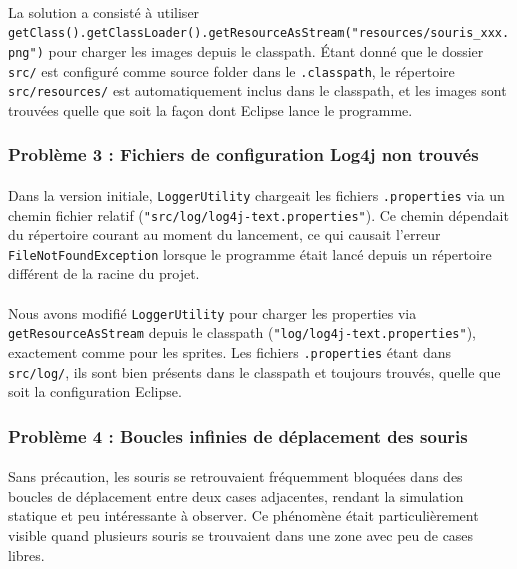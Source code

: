 \paragraph{} La solution a consisté à utiliser \texttt{getClass().getClassLoader().getResourceAsStream("resources/souris\_xxx.png")} pour charger les images depuis le classpath. Étant donné que le dossier \texttt{src/} est configuré comme source folder dans le \texttt{.classpath}, le répertoire \texttt{src/resources/} est automatiquement inclus dans le classpath, et les images sont trouvées quelle que soit la façon dont Eclipse lance le programme.

\subsubsection{Problème 3 : Fichiers de configuration Log4j non trouvés}

\paragraph{} Dans la version initiale, \texttt{LoggerUtility} chargeait les fichiers \texttt{.properties} via un chemin fichier relatif (\texttt{"src/log/log4j-text.properties"}). Ce chemin dépendait du répertoire courant au moment du lancement, ce qui causait l'erreur \texttt{FileNotFoundException} lorsque le programme était lancé depuis un répertoire différent de la racine du projet.

\paragraph{} Nous avons modifié \texttt{LoggerUtility} pour charger les properties via \texttt{getResourceAsStream} depuis le classpath (\texttt{"log/log4j-text.properties"}), exactement comme pour les sprites. Les fichiers \texttt{.properties} étant dans \texttt{src/log/}, ils sont bien présents dans le classpath et toujours trouvés, quelle que soit la configuration Eclipse.

\subsubsection{Problème 4 : Boucles infinies de déplacement des souris}

\paragraph{} Sans précaution, les souris se retrouvaient fréquemment bloquées dans des boucles de déplacement entre deux cases adjacentes, rendant la simulation statique et peu intéressante à observer. Ce phénomène était particulièrement visible quand plusieurs souris se trouvaient dans une zone avec peu de cases libres.

